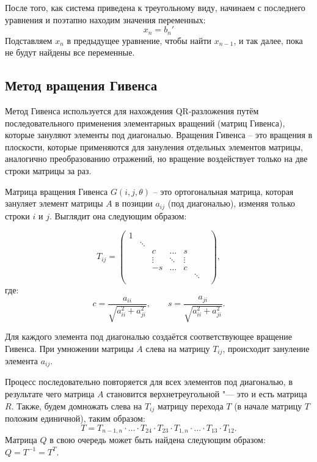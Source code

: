 \documentclass[12pt, a4paper]{article}
\begin{document}
	После того, как система приведена к треугольному виду, начинаем с последнего уравнения и поэтапно находим значения переменных:
	$$x_n = b_n'$$
	Подставляем $x_n$ в предыдущее уравнение, чтобы найти $x_{n-1}$, и так далее, пока не будут найдены все переменные.
	
	\subsection{Метод вращения Гивенса}
	
	Метод Гивенса используется для нахождения QR-разложения путём последовательного применения элементарных вращений (матриц Гивенса), которые зануляют элементы под диагональю. Вращения Гивенса -- это вращения в плоскости, которые применяются для зануления отдельных элементов матрицы, аналогично преобразованию отражений, но вращение воздействует только на две строки матрицы за раз.
	
	Матрица вращения Гивенса $G(i,j,\theta)$ -- это ортогональная матрица, которая зануляет элемент матрицы $A$ в позиции $a_{ij}$ (под диагональю), изменяя только строки $i$ и $j$. Выглядит она следующим образом:
	
	\begin{equation*}
		T_{ij} =
		\begin{pmatrix}
			1 & & & & & \\
			& \ddots & & & & \\
			& & c & \dots & s & \\
			& & \vdots & \ddots & \vdots & \\
			& & -s & \dots & c & \\
			& & & & & \ddots & \\
		\end{pmatrix},
	\end{equation*}
	где:
	$$c=\frac{a_{ii}}{\sqrt{a_{ii}^2+a_{ji}^2}}, \qquad s=\frac{a_{ji}}{\sqrt{a_{ii}^2+a_{ji}^2}}.$$
	
	Для каждого элемента под диагональю создаётся соответствующее вращение Гивенса. При умножении матрицы $A$ слева на матрицу $T_{ij}$, происходит зануление элемента $a_{ij}$. 
	
	Процесс последовательно повторяется для всех элементов под диагональю, в результате чего матрица $A$ становится верхнетреугольной "--- это и есть матрица $R$. Также, будем домножать слева  на $T_{ij}$  матрицу перехода $T$ (в начале матрицу $T$ положим единичной), таким образом: 
	\begin{equation*}
		T = T_{n-1, n} \cdot \ldots \cdot T_{24} \cdot T_{23} \cdot  T_{1,n} \cdot \ldots \cdot T_{13} \cdot T_{12}.
	\end{equation*}
Матрица $Q$ в свою очередь может быть найдена следующим образом: $Q=T^{-1}=T^{T}$. 
\end{document}
